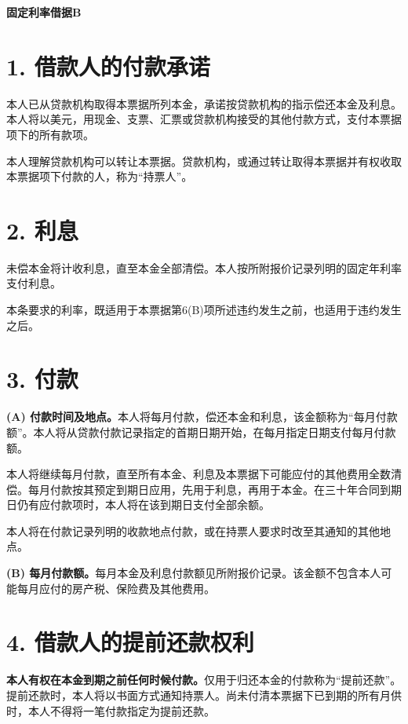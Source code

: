 \documentclass[UTF8,fontset=none,11pt,a4paper]{ctexart}
\begin{document}
{\noindent\fontsize{20}{25}\selectfont\bfseries 固定利率借据B\par}
\vspace{10pt}
\section*{1. 借款人的付款承诺}
本人已从贷款机构取得本票据所列本金，承诺按贷款机构的指示偿还本金及利息。本人将以美元，用现金、支票、汇票或贷款机构接受的其他付款方式，支付本票据项下的所有款项。


本人理解贷款机构可以转让本票据。贷款机构，或通过转让取得本票据并有权收取本票据项下付款的人，称为“持票人”。


\section*{2. 利息}
未偿本金将计收利息，直至本金全部清偿。本人按所附报价记录列明的固定年利率支付利息。


本条要求的利率，既适用于本票据第6(B)项所述违约发生之前，也适用于违约发生之后。


\section*{3. 付款}
\textbf{(A) 付款时间及地点。}本人将每月付款，偿还本金和利息，该金额称为“每月付款额”。本人将从贷款付款记录指定的首期日期开始，在每月指定日期支付每月付款额。


本人将继续每月付款，直至所有本金、利息及本票据下可能应付的其他费用全数清偿。每月付款按其预定到期日应用，先用于利息，再用于本金。在三十年合同到期日仍有应付款项时，本人将在该到期日支付全部余额。


本人将在付款记录列明的收款地点付款，或在持票人要求时改至其通知的其他地点。


\textbf{(B) 每月付款额。}每月本金及利息付款额见所附报价记录。该金额不包含本人可能每月应付的房产税、保险费及其他费用。


\section*{4. 借款人的提前还款权利}
\textbf{本人有权在本金到期之前任何时候付款。}仅用于归还本金的付款称为“提前还款”。提前还款时，本人将以书面方式通知持票人。尚未付清本票据下已到期的所有月供时，本人不得将一笔付款指定为提前还款。
\end{document}
